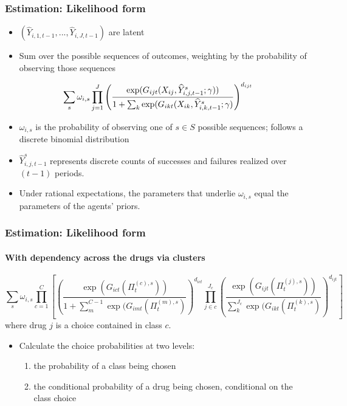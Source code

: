 \begin{frame}
\frametitle{Estimation: Likelihood form}

\begin{itemize}
\item $(\widehat{Y}_{i,1,t-1},...,\widehat{Y}_{i,J,t-1})$ are latent

\item Sum over the possible sequences of outcomes, weighting by the
probability of observing those sequences
\end{itemize}

\[
\sum_{s}\omega_{i,s}\prod_{j=1}^{J}\left( \frac{\exp (G_{ijt}(X_{ij},%
\widehat{Y}^{s}_{i,j,t-1};\gamma ))}{1+\sum_{k}\exp (G_{ikt}(X_{ik},\widehat{%
Y}^{s}_{i,k,t-1};\gamma )}\right) ^{d_{ijt}}
\]

\begin{itemize}
\item $\omega_{i,s}$ is the probability of observing one of $s\in S$
possible sequences; follows a discrete binomial distribution

\item $\widehat{Y}^{s}_{i,j,t-1}$ represents discrete counts of successes
and failures realized over $(t-1)$ periods.

\item Under rational expectations, the parameters that underlie $\omega_{i,s}
$ equal the parameters of the agents' priors.
\end{itemize}

\hyperlink{RESULTS}{}
\end{frame}


\begin{frame}
\frametitle{Estimation: Likelihood form} \framesubtitle{With dependency
across the drugs via clusters}

{\footnotesize 
\[
\sum_{s}\omega_{i,s}\prod_{c=1}^{C}\left[\left( \frac{\exp (G_{ict}(\Pi
_{t}^{(c),s}))}{1+\sum_{m}^{C-1}\exp (G_{imt}(\Pi _{t}^{(m),s})}\right)
^{d_{ict}}\prod_{j\in c}^{J_{c}}\left( \frac{\exp (G_{ijt}(\Pi _{t}^{(j),s}))%
}{\sum_{k}^{J_{c}}\exp (G_{ikt}(\Pi _{t}^{(k),s})}\right) ^{d_{ijt}}\right]
\]
}{\normalsize where drug $j$ is a choice contained in class $c$. \bigskip }

\begin{itemize}
\item {\normalsize Calculate the choice probabilities at two levels: }

\begin{enumerate}
\item {\normalsize the probability of a class being chosen }

\item {\normalsize the conditional probability of a drug being chosen,
conditional on the class choice }
\end{enumerate}
\end{itemize}

{\normalsize \hyperlink{RESULTS}{} }
\end{frame}

